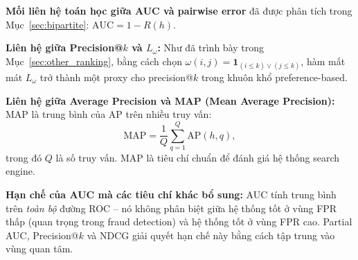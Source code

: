 \begin{morong}


\textbf{Mối liên hệ toán học giữa AUC và pairwise error} đã được phân tích trong Mục~\ref{sec:bipartite}: $\mathrm{AUC} = 1 - R(h)$.

\textbf{Liên hệ giữa Precision@$k$ và $L_\omega$:} Như đã trình bày trong Mục~\ref{sec:other_ranking}, bằng cách chọn $\omega(i,j) = \mathbf{1}_{(i \leq k) \vee (j \leq k)}$, hàm mất mát $L_\omega$ trở thành một proxy cho precision@$k$ trong khuôn khổ preference-based.

\textbf{Liên hệ giữa Average Precision và MAP (Mean Average Precision):} MAP là trung bình của AP trên nhiều truy vấn:
\begin{equation}
    \mathrm{MAP} = \frac{1}{Q}\sum_{q=1}^{Q} \mathrm{AP}(h, q),
    \label{eq:map}
\end{equation}
trong đó $Q$ là số truy vấn. MAP là tiêu chí chuẩn để đánh giá hệ thống search engine.

\textbf{Hạn chế của AUC mà các tiêu chí khác bổ sung:} AUC tính trung bình trên \emph{toàn bộ} đường ROC -- nó không phân biệt giữa hệ thống tốt ở vùng FPR thấp (quan trọng trong fraud detection) và hệ thống tốt ở vùng FPR cao. Partial AUC, Precision@$k$ và NDCG giải quyết hạn chế này bằng cách tập trung vào vùng quan tâm.
\end{morong}

